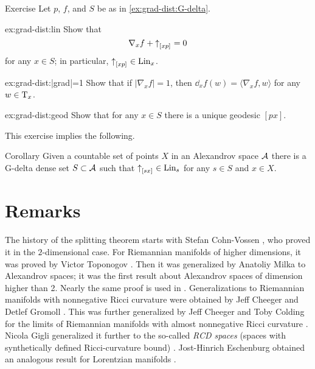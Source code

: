 \begin{thm}{Exercise}\label{ex:grad-dist}
Let $p$, $f$, and $S$ be as in \ref{ex:grad-dist:G-delta}.

\begin{subthm}{ex:grad-dist:lin}
Show that 
\[\nabla_xf+{\uparrow}_{[{x}{p}]_{{}}}=0\]
for any 
$x\in S$;
in particular, ${\uparrow}_{[{x}{p}]_{{}}}\in \mathop{\rm Lin}\nolimits_x$.
\end{subthm}

\begin{subthm}{ex:grad-dist:|grad|=1}
Show that if $|\nabla_xf|=1$, then $\dd_xf(w)= \langle\nabla_xf,w\rangle$ for any $w\in \mathrm{T}_x$.
\end{subthm}

\begin{subthm}{ex:grad-dist:geod}
Show that for any $x\in S$ there is a unique geodesic $[px]$.
\end{subthm}

\end{thm}

This exercise implies the following.

\begin{thm}{Corollary}\label{cor:euclid-subcone}
Given a countable set of points $X$ in an Alexandrov space $\mathcal{A}$
there is a G-delta dense set $S\subset\mathcal{A}$
such that 
${\uparrow}_{[{s}{x}]_{{}}}\in \mathop{\rm Lin}\nolimits_s$
for any $s\in S$ and $x\in X$.
\end{thm}

\section{Remarks}

The history of the splitting theorem starts with Stefan Cohn-Vossen \cite{cohn-vossen_line},
who proved it in the $2$-dimensional case.
For Riemannian manifolds of higher dimensions,
it was proved by Victor Toponogov \cite{toponogov-globalization+splitting}.
Then it was generalized by Anatoliy Milka \cite{milka-line}
to Alexandrov spaces;
it was the first result about Alexandrov spaces of dimension higher than 2.
Nearly the same proof is used in \cite[1.5]{burago-burago-ivanov}.
Generalizations to Riemannian manifolds with nonnegative Ricci curvature were obtained by Jeff Cheeger and Detlef Gromoll \cite{cheeger-gromoll-split}.
This was further generalized by Jeff Cheeger and Toby Colding for the limits of Riemannian manifolds with almost nonnegative Ricci curvature \cite{cheeger-colding-alm-rigidity}.
Nicola Gigli generalized it further to the so-called {}\emph{RCD spaces} (spaces with synthetically defined Ricci-curvature bound) \cite{gigli2013splitting, gigli-splitting-overview}.
Jost-Hinrich Eschenburg obtained an analogous result for Lorentzian manifolds \cite{eshenburg-split}.

